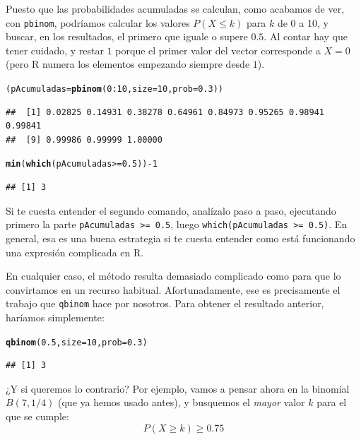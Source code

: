 \documentclass[10pt,a4paper]{article}\usepackage[]{graphicx}\usepackage[]{color}
\makeatletter
\newcommand{\hlnum}[1]{\textcolor[rgb]{0.686,0.059,0.569}{#1}}%
\newcommand{\hlopt}[1]{\textcolor[rgb]{0,0,0}{#1}}%
\newcommand{\hlstd}[1]{\textcolor[rgb]{0.345,0.345,0.345}{#1}}%
\newcommand{\hlkwb}[1]{\textcolor[rgb]{0.69,0.353,0.396}{#1}}%
\newcommand{\hlkwc}[1]{\textcolor[rgb]{0.333,0.667,0.333}{#1}}%
\newcommand{\hlkwd}[1]{\textcolor[rgb]{0.737,0.353,0.396}{\textbf{#1}}}%
\newenvironment{kframe}{%
 \def\at@end@of@kframe{}%
 \ifinner\ifhmode%
  \def\at@end@of@kframe{\end{minipage}}%
  \begin{minipage}{\columnwidth}%
 \fi\fi%
 \def\FrameCommand##1{\hskip\@totalleftmargin \hskip-\fboxsep
 \colorbox{shadecolor}{##1}\hskip-\fboxsep
     \hskip-\linewidth \hskip-\@totalleftmargin \hskip\columnwidth}%
 \MakeFramed {\advance\hsize-\width
   \@totalleftmargin\z@ \linewidth\hsize
   \@setminipage}}%
 {\par\unskip\endMakeFramed%
 \at@end@of@kframe}
\newenvironment{knitrout}{}{} %
\newcounter{cont01}
\makeatother
\begin{document}
Puesto que las probabilidades acumuladas se calculan, como acabamos de ver, con {\tt pbinom}, podríamos calcular los valores $P(X \leq k)$ para $k$ de 0 a 10, y buscar, en los resultados, el primero que iguale o supere $0.5$. Al contar hay que tener cuidado, y restar $1$ porque el primer valor del vector corresponde a $X=0$ (pero R numera los elementos empezando siempre desde $1$).
\begin{knitrout}
\color{fgcolor}\begin{kframe}
\begin{alltt}
\hlstd{(pAcumuladas} \hlkwb{=} \hlkwd{pbinom}\hlstd{(}\hlnum{0}\hlopt{:}\hlnum{10}\hlstd{,} \hlkwc{size}\hlstd{=} \hlnum{10}\hlstd{,} \hlkwc{prob}\hlstd{=}\hlnum{0.3}\hlstd{))}
\end{alltt}
\begin{verbatim}
##  [1] 0.02825 0.14931 0.38278 0.64961 0.84973 0.95265 0.98941 0.99841
##  [9] 0.99986 0.99999 1.00000
\end{verbatim}
\begin{alltt}
\hlkwd{min}\hlstd{(}\hlkwd{which}\hlstd{(pAcumuladas} \hlopt{>=} \hlnum{0.5}\hlstd{))} \hlopt{-} \hlnum{1}
\end{alltt}
\begin{verbatim}
## [1] 3
\end{verbatim}
\end{kframe}
\end{knitrout}
Si te cuesta entender el segundo comando, analízalo paso a paso, ejecutando primero la parte
{\tt pAcumuladas >= 0.5}, luego {\tt which(pAcumuladas >= 0.5)}. En general, esa es una buena estrategia si te cuesta entender como está funcionando una expresión complicada en R.

En cualquier caso, el método resulta demasiado complicado como para que lo convirtamos en un recurso habitual. Afortunadamente, ese es precisamente el trabajo que {\tt qbinom} hace por nosotros. Para obtener el resultado anterior, haríamos simplemente:
\begin{knitrout}
\color{fgcolor}\begin{kframe}
\begin{alltt}
\hlkwd{qbinom}\hlstd{(}\hlnum{0.5}\hlstd{,} \hlkwc{size}\hlstd{=} \hlnum{10}\hlstd{,} \hlkwc{prob}\hlstd{=}\hlnum{0.3}\hlstd{)}
\end{alltt}
\begin{verbatim}
## [1] 3
\end{verbatim}
\end{kframe}
\end{knitrout}
¿Y si queremos lo contrario? Por ejemplo, vamos a pensar ahora en la binomial $B(7,1/4)$ (que ya hemos usado antes), y busquemos el {\em mayor} valor $k$ para el que se cumple:
\[P(X \geq k)\geq 0.75\]
\end{document}
